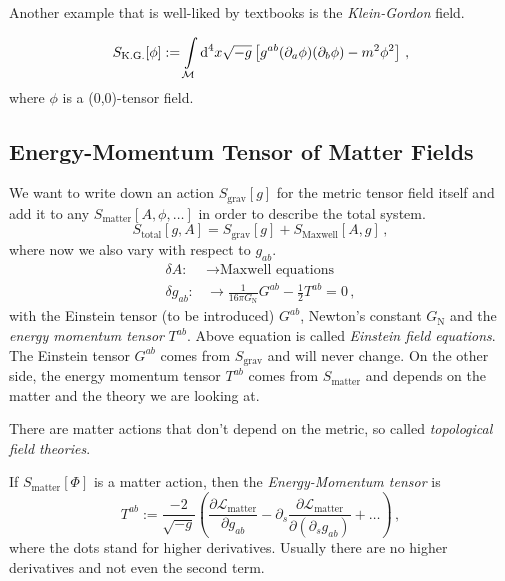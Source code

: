 Another example that is well-liked by textbooks is the \textit{Klein-Gordon} field.
\begin{example}
    \begin{equation*}
        S_\text{K.G.}[\phi] := \int\limits_{\mathcal{M}}\operatorname{d}^4\!x\sqrt{-g} \left[ 
        g^{ab}(\partial_a \phi) (\partial_b \phi) - m^2 \phi^2 \right]\,,
    \end{equation*}
    where $\phi$ is a (0,0)-tensor field.
\end{example}

\subsection{Energy-Momentum Tensor of Matter Fields}
We want to write down an action $S_\text{grav}[g]$ for the metric tensor field itself
and add it to any $S_\text{matter}[A, \phi, \ldots]$ in order to describe the total system.
\begin{equation}
    S_\text{total}[g, A] = S_\text{grav}[g] + S_\text{Maxwell}[A,g]\,,
\end{equation}
where now we also vary with respect to $g_{ab}$.
\begin{align}
    \delta A: &\to \text{Maxwell equations}\\
    \delta g_{ab}: &\to \frac{1}{16\pi G_\text{N}} G^{ab} - \frac{1}{2}T^{ab}=0\,,
\end{align}
with the Einstein tensor (to be introduced) $G^{ab}$, Newton's constant $G_\text{N}$
and the \textit{energy momentum tensor} $T^{ab}$.
Above equation is called \textit{Einstein field equations}.
The Einstein tensor $G^{ab}$ comes from $S_\text{grav}$ and will never change.
On the other side, the energy momentum tensor $T^{ab}$ comes from
$S_\text{matter}$ and depends on the matter and the theory we are looking at.
\begin{note}
    There are matter actions that don't depend on the metric, so called
    \textit{topological field theories}.
\end{note}
\begin{defn}
    If $S_\text{matter}[\Phi]$ is a matter action, then the \textit{Energy-Momentum tensor}
    is
    \begin{equation}
        T^{ab}:= \frac{-2}{\sqrt{-g}}\left( \frac{\partial \mathcal{L}_\text{matter}}{\partial g_{ab}}
        - \partial_s \frac{\partial \mathcal{L}_\text{matter}}{\partial(\partial_s g_{ab})} + \ldots\right)\,,
    \end{equation}
    where the dots stand for higher derivatives. 
    Usually there are no higher derivatives and not even the second term.
\end{defn}
